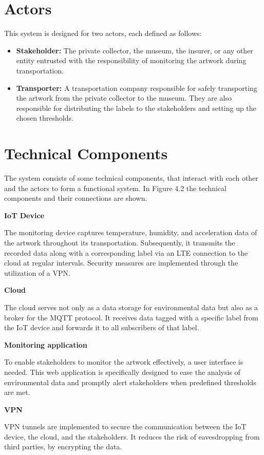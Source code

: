 \section{Actors}
This system is designed for two actors, each defined as follows:
\begin{itemize}
    \item \textbf{Stakeholder:} The private collector, the museum, the insurer, or any other entity entrusted with the responsibility of monitoring the artwork during transportation.
    \item \textbf{Transporter:} A transportation company responsible for safely transporting the artwork from the private collector to the museum. They are also responsible for distributing the labels to the stakeholders and setting up the chosen thresholds.
\end{itemize}

\section{Technical Components}
The system consists of some technical components, that interact with each other and the actors to form a functional system. In Figure 4.2 the technical components and their connections are shown.

\textbf{IoT Device}

The monitoring device captures temperature, humidity, and acceleration data of the artwork throughout its transportation. Subsequently, it transmits the recorded data along with a corresponding label via an LTE connection to the cloud at regular intervals. Security measures are implemented through the utilization of a VPN.

\textbf{Cloud}

The cloud serves not only as a data storage for environmental data but also as a broker for the MQTT protocol. It receives data tagged with a specific label from the IoT device and forwards it to all subscribers of that label.

\textbf{Monitoring application}

To enable stakeholders to monitor the artwork effectively, a user interface is needed. This web application is specifically designed to ease the analysis of environmental data and promptly alert stakeholders when predefined thresholds are met.

\textbf{VPN}

VPN tunnels are implemented to secure the communication between the IoT device, the cloud, and the stakeholders. It reduces the risk of eavesdropping from third parties, by encrypting the data.


